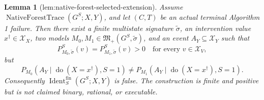 \documentclass{article}
\newtheorem{lemma}{Lemma}
\begin{document}
\begin{lemma}[lem:native-forest-selected-extension]\label{lem:native-forest-selected-extension}
Assume \(\operatorname{NativeForestTrace}(G^S;X,Y)\), and let \((C,T)\) be an actual terminal Algorithm 1 failure. Then there exist a finite multistate signature \(\widetilde\sigma\), an intervention value \(x^\dagger\in\mathcal X_X\), two models \(M_0,M_1\in\mathfrak M_+(G^S,\widetilde\sigma)\), and an event \(A_Y\subseteq\mathcal X_Y\) such that
\[
 P_{M_0,\widetilde\sigma}^S(v)=P_{M_1,\widetilde\sigma}^S(v)>0
 \quad\text{for every }v\in\mathcal X_V,
\]
but
\[
 P_{M_0}(A_Y\mid\operatorname{do}(X=x^\dagger),S=1)
 \ne P_{M_1}(A_Y\mid\operatorname{do}(X=x^\dagger),S=1).
\]
Consequently \(\operatorname{Ident}^{\mathrm{fin}}_S(G^S;X,Y)\) is false. The construction is finite and positive but is not claimed binary, rational, or executable.
\end{lemma}
\end{document}
